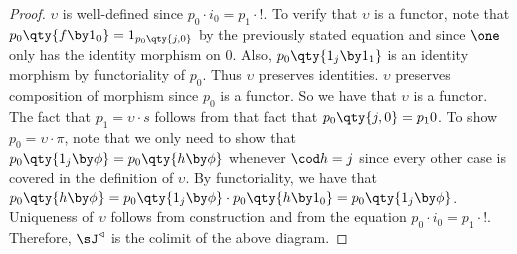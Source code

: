 \documentclass[main.tex]{subfiles}
\begin{document}
\begin{proof}
	$\upsilon$ is well-defined since $p_{0} \cdot i_{0}  = p_{1} \cdot !  $. To
	verify that $\upsilon$ is a functor, note that $p_{0}\qty{f\by1_{0}} =
	1_{p_{0}\qty{j,0}}$ by the previously stated equation and since $\one$ only
	has the identity morphism on $0$. Also, $p_{0}\qty{1_{j}\by1_{1}}$ is an
	identity morphism by functoriality of $p_{0}$. Thus $\upsilon$ preserves
	identities. $\upsilon$ preserves composition of morphism since $p_{0}$ is a
	functor. So we have that $\upsilon$  is a functor. The fact that $p_{1} =
	\upsilon \cdot  s $ follows from that fact that $p_{0}\qty{j,0}  = p_{1} 0
	$. To show $p_{0} = \upsilon \cdot  \pi $, note that we only need to show
	that $p_{0}\qty{1_{j}\by\phi} = p_{0}\qty{h\by\phi}$ whenever $\cod h = j$
	since every other case is covered in the definition of $\upsilon$. By
	functoriality, we have that $p_{0}\qty{h\by\phi} =
	p_{0}\qty{1_{j}\by\phi}\cdot p_{0}\qty{h\by 1_{0}} =
	p_{0}\qty{1_{j}\by\phi}$. Uniqueness of $\upsilon$ follows from construction
	and from the equation $p_{0} \cdot i_{0}  = p_{1} \cdot !  $. Therefore,
	$\sJ^{\triangleleft}$ is the colimit of the above diagram.
\end{proof}
\end{document}
